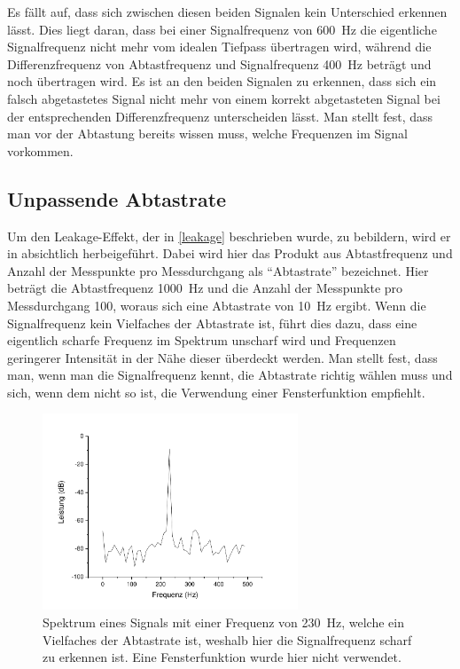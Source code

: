 \documentclass[
a4paper,
12pt,
pagesize,
ngerman
]{scrartcl}
\begin{document}
	Es fällt auf, dass sich zwischen diesen beiden Signalen kein Unterschied erkennen lässt.
	Dies liegt daran, dass bei einer Signalfrequenz von \SI{600}{\hertz} die eigentliche Signalfrequenz nicht mehr vom idealen Tiefpass übertragen wird, während die Differenzfrequenz von Abtastfrequenz und Signalfrequenz \SI{400}{\hertz} beträgt und noch übertragen wird.
	Es ist an den beiden Signalen zu erkennen, dass sich ein falsch abgetastetes Signal nicht mehr von einem korrekt abgetasteten Signal bei der entsprechenden Differenzfrequenz unterscheiden lässt.
	Man stellt fest, dass man vor der Abtastung bereits wissen muss, welche Frequenzen im Signal vorkommen. 
	
	\subsection{Unpassende Abtastrate}
	Um den Leakage-Effekt, der in \cref{leakage} beschrieben wurde, zu bebildern, wird er in  absichtlich herbeigeführt.
	Dabei wird hier das Produkt aus Abtastfrequenz und Anzahl der Messpunkte pro Messdurchgang als \enquote{Abtastrate} bezeichnet.
	Hier beträgt die Abtastfrequenz \SI{1000}{\hertz} und die Anzahl der Messpunkte pro Messdurchgang \num{100}, woraus sich eine Abtastrate von \SI{10}{\hertz} ergibt.
	Wenn die Signalfrequenz kein Vielfaches der Abtastrate ist, führt dies dazu, dass eine eigentlich scharfe Frequenz im Spektrum unscharf wird und Frequenzen geringerer Intensität in der Nähe dieser überdeckt werden.
	Man stellt fest, dass man, wenn man die Signalfrequenz kennt, die Abtastrate richtig wählen muss und sich, wenn dem nicht so ist, die Verwendung einer Fensterfunktion empfiehlt.
	
	\begin{figure}[H]  
		\includegraphics[width=0.68\textwidth]{Origin-Files/unpassend_230nonhann}
		\centering
		\caption{
			Spektrum eines Signals mit einer Frequenz von \SI{230}{\hertz}, welche ein Vielfaches der Abtastrate ist, weshalb hier die Signalfrequenz scharf zu erkennen ist. Eine Fensterfunktion wurde hier nicht verwendet.
		}
		\label{fig_tag3_unpassend_230hz}
		\centering
	\end{figure}
	
\end{document}
